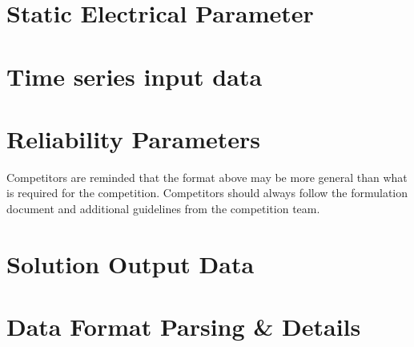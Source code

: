 \documentclass{article}
\begin{document}
\section{Static Electrical Parameter}
\label{sec:format_spec}



\section{Time series input data}


\section{Reliability Parameters}


Competitors are reminded that the format above may be more general than
what is required for the competition.
Competitors should always
follow the formulation document and additional guidelines from the competition team.





\section{Solution Output Data}


\section{Data Format Parsing \& Details}

\end{document}
